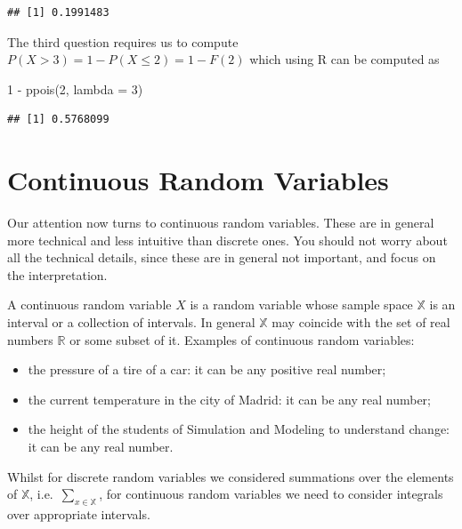 \documentclass[
]{book}
\newenvironment{Shaded}{\begin{snugshade}}{\end{snugshade}}
\newcommand{\AttributeTok}[1]{\textcolor[rgb]{0.77,0.63,0.00}{#1}}
\newcommand{\DecValTok}[1]{\textcolor[rgb]{0.00,0.00,0.81}{#1}}
\newcommand{\FunctionTok}[1]{\textcolor[rgb]{0.00,0.00,0.00}{#1}}
\newcommand{\NormalTok}[1]{#1}
\newcommand{\SpecialCharTok}[1]{\textcolor[rgb]{0.00,0.00,0.00}{#1}}
\theoremstyle{definition}
\theoremstyle{definition}
\theoremstyle{definition}
\theoremstyle{definition}
\theoremstyle{remark}
\begin{document}
\begin{verbatim}
## [1] 0.1991483
\end{verbatim}

The third question requires us to compute \(P(X>3) = 1 - P(X\leq 2) = 1 - F(2)\) which using R can be computed as

\begin{Shaded}
\begin{Highlighting}[]
\DecValTok{1} \SpecialCharTok{{-}} \FunctionTok{ppois}\NormalTok{(}\DecValTok{2}\NormalTok{, }\AttributeTok{lambda =} \DecValTok{3}\NormalTok{)}
\end{Highlighting}
\end{Shaded}

\begin{verbatim}
## [1] 0.5768099
\end{verbatim}

\hypertarget{continuous-random-variables-1}{%
\section{Continuous Random Variables}\label{continuous-random-variables-1}}

Our attention now turns to continuous random variables. These are in general more technical and less intuitive than discrete ones. You should not worry about all the technical details, since these are in general not important, and focus on the interpretation.

A continuous random variable \(X\) is a random variable whose sample space \(\mathbb{X}\) is an interval or a collection of intervals. In general \(\mathbb{X}\) may coincide with the set of real numbers \(\mathbb{R}\) or some subset of it. Examples of continuous random variables:

\begin{itemize}
\item
  the pressure of a tire of a car: it can be any positive real number;
\item
  the current temperature in the city of Madrid: it can be any real number;
\item
  the height of the students of Simulation and Modeling to understand change: it can be any real number.
\end{itemize}

Whilst for discrete random variables we considered summations over the elements of \(\mathbb{X}\), i.e.~\(\sum_{x\in\mathbb{X}}\), for continuous random variables we need to consider integrals over appropriate intervals.
\end{document}
